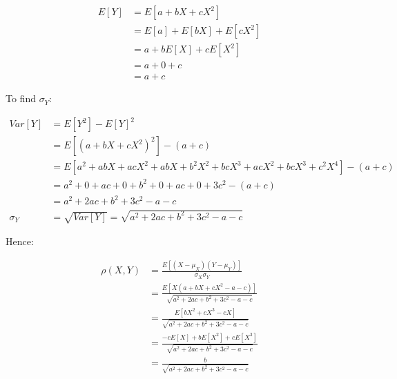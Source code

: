 \documentclass[11pt,letterpaper,titlepage]{article}
\begin{document}
\begin{enumerate}
\begin{enumerate}
        \begin{equation*}
            \begin{aligned}
            E[Y] &= E[a + b X + c X^2] \\
            &= E[a] + E[b X] + E[c X^2] \\
            &= a + b E[X] + c E[X^2] \\
            &= a + 0 + c \\
            &= a + c
            \end{aligned}
        \end{equation*}
        
        To find $ \sigma_{Y} $:
        
        \begin{equation*}
            \begin{aligned}
            Var[Y] &= E[Y^2] - E[Y]^2 \\
            &= E[(a + b X + c X^2)^2] - (a + c) \\
            &= E[a^2 + a b X + a c X^2 + a b X + b^2 X^2 + b c X^3 + a c X^2 + b c X^3 + c^2 X^4] - (a + c) \\
            &= a^2 + 0 + ac + 0 + b^2 + 0 + a c + 0 + 3 c^2 - (a + c) \\
            &= a^2 + 2 a c + b^2 + 3 c^2 - a - c \\
            \sigma_{Y} &= \sqrt{Var[Y]} = \sqrt{a^2 + 2 a c + b^2 + 3 c^2 - a - c}
            \end{aligned}
        \end{equation*}
        
        Hence:
        
        \begin{equation*}
            \begin{aligned}
                \rho(X, Y) &= \frac{E[(X - \mu_{X})(Y - \mu_{Y})]}{\sigma_{X}\sigma_{Y}} \\
                &= \frac{E[X(a + b X + c X^2 - a - c)]}{\sqrt{a^2 + 2 a c + b^2 + 3 c^2 - a - c}} \\
                &= \frac{E[b X^2 + c X^3 - c X]}{\sqrt{a^2 + 2 a c + b^2 + 3 c^2 - a - c}} \\
                &= \frac{-c E[X] + b E[X^2] + c E[X^3]}{\sqrt{a^2 + 2 a c + b^2 + 3 c^2 - a - c}} \\
                &= \frac{b}{\sqrt{a^2 + 2 a c + b^2 + 3 c^2 - a - c}}
            \end{aligned}
        \end{equation*}
        
    \end{enumerate}
    
\end{enumerate}
\end{document}

